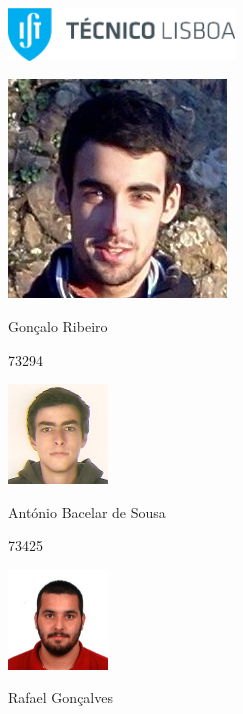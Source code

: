 \begin{titlepage}

	\begin{center}

		\includegraphics[width=6cm]{./title}\\[1cm]
		\begin{minipage}{0.25\textwidth}
			\centering
                        \includegraphics[width=0.1\paperwidth]{ist173294}

			Gonçalo Ribeiro

                        73294
		\end{minipage}
		\begin{minipage}{0.4\textwidth}
                        \centering
			\includegraphics[width=0.1\paperwidth]{ist173425}

			António Bacelar de Sousa

                        73425
		\end{minipage}
		\begin{minipage}{0.25\textwidth}
                        \centering
			\includegraphics[width=0.1\paperwidth]{ist173786}

			Rafael Gonçalves


\end{minipage}
\end{center}
\end{titlepage}
